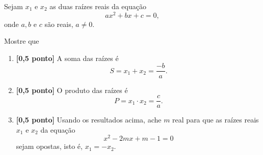 Sejam $x_1$ e $x_2$ as duas raízes reais da equação
\[
	ax^2+bx+c=0,
\]
onde $a,b$ e $c$ são reais, $a\not=0$.

Mostre que
\begin{enumerate}
	\item{\bf [0,5 ponto]} A soma das raízes é 
	\[
		S=x_1+x_2=\frac{-b}{a}.
	\]
	\item{\bf [0,5 ponto]} O produto das raízes é
	\[
		P=x_1\cdot x_2=\frac{c}{a}.
	\]
	\item{\bf [0,5 ponto]} Usando os resultados acima, ache $m$ real para que as raízes reais $x_1$ e $x_2$ da equação
	\[
		x^2-2mx+m-1=0
	\]
	sejam opostas, isto é, $x_1=-x_2$.
\end{enumerate}
